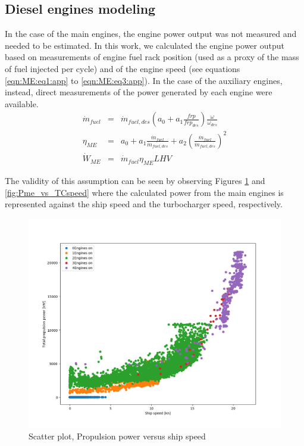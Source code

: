 \documentclass[preprint,12pt]{elsarticle}
\begin{document}
\subsection{Diesel engines modeling} \label{sec:app:met:engines}

In the case of the main engines, the engine power output was not measured and needed to be estimated. In this work, we calculated the engine power output based on measurements of engine fuel rack position (used as a proxy of the mass of fuel injected per cycle) and of the engine speed (see equations \ref{eqn:ME:eq1:app} to \ref{eqn:ME:eq3:app}). In the case of the auxiliary engines, instead, direct measurements of the power generated by each engine were available. 
\begin{eqnarray}
\dot{m}_{fuel} & = & \dot{m}_{fuel,des} \left(a_0 + a_1 \frac{frp}{frp_{des}}\right) \frac{\omega}{\omega_{des}} \label{eqn:ME:eq1:app} \\
\eta_{ME} & = & a_0 + a_1 \frac{\dot{m}_{fuel}}{\dot{m}_{fuel,des}} + a_2 \left( \frac{\dot{m}_{fuel}}{\dot{m}_{fuel,des}} \right)^2 \label{eqn:ME:eq2:app} \\
\dot{W}_{ME} & = & \dot{m}_{fuel} \eta_{ME} LHV \label{eqn:ME:eq3:app}
\end{eqnarray}

The validity of this assumption can be seen by observing Figures \ref{fig:Pme_vs_vship_Neng} and \ref{fig:Pme_vs_TCspeed} where the calculated  power from the main engines is represented against the ship speed and the turbocharger speed, respectively.

\begin{figure}
	\centering
	\includegraphics[width=0.9\linewidth]{Figures/Pme_vs_vship_Neng}
	\caption{Scatter plot, Propulsion power versus ship speed}
	\label{fig:Pme_vs_vship_Neng}
\end{figure}
\end{document}
